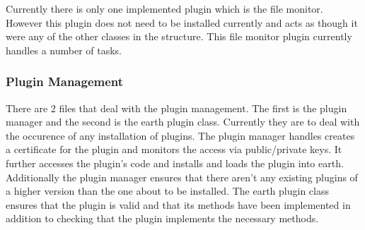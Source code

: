\documentclass{article}
\begin{document}
Currently there is only one implemented plugin which is the file monitor. However this plugin does not need to be installed currently and acts as though it were any of the other classes in the structure.
This file monitor plugin currently handles a number of tasks. 

\subsubsection{Plugin Management}

There are 2 files that deal with the plugin management. The first is the plugin manager and the second is the earth plugin class.
Currently they are to deal with the occurence of any installation of plugins. The plugin manager handles creates a certificate for the plugin and monitors the access via public/private keys. It further accesses the plugin's code and installs and loads the plugin into earth. Additionally the plugin manager ensures that there aren't any existing plugins of a higher version than the one about to be installed. The earth plugin class ensures that the plugin is valid and that its methods have been implemented in addition to checking that the plugin implements the necessary methods.
\end{document}
